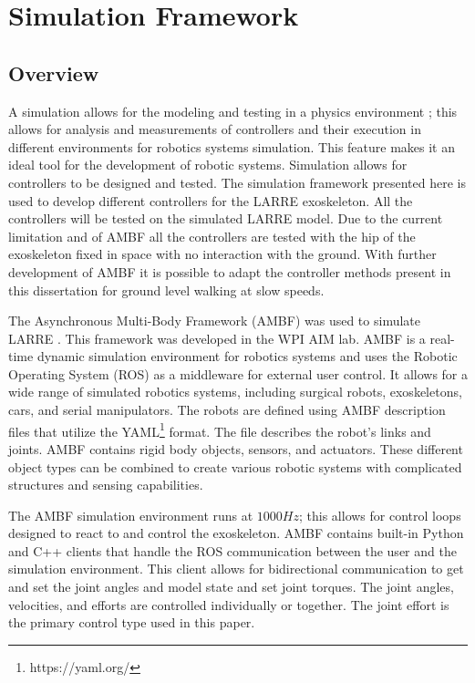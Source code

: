 \chapter{Simulation Framework}
\label{chap:sim}
\section{Overview}

A simulation allows for the modeling and testing in a physics environment \cite{vzlajpah2008simulation}; this allows for analysis and measurements of controllers and their execution in different environments for robotics systems simulation. This feature makes it an ideal tool for the development of robotic systems. Simulation allows for controllers to be designed and tested. The simulation framework presented here is used to develop different controllers for the LARRE exoskeleton. All the controllers will be tested on the simulated LARRE model. Due to the current limitation and of AMBF all the controllers are tested with the hip of the exoskeleton fixed in space with no interaction with the ground. With further development of AMBF it is possible to adapt the controller methods present in this dissertation for ground level walking at slow speeds. 

The Asynchronous Multi-Body Framework (AMBF) was used to simulate LARRE \cite{AMBF}. This framework was developed in the WPI AIM lab. 
AMBF is a real-time dynamic simulation environment for robotics systems and uses the Robotic Operating System (ROS)\cite{quigley2009ros} as a middleware for external user control. It allows for a wide range of simulated robotics systems, including surgical robots, exoskeletons, cars, and serial manipulators. The robots are defined using AMBF description files that utilize the YAML\footnote{https://yaml.org/} format. The file describes the robot's links and joints. AMBF contains rigid body objects, sensors, and actuators. These different object types can be combined to create various robotic systems with complicated structures and sensing capabilities. 
 
 
 The AMBF simulation environment runs at $1000Hz$; this allows for control loops designed to react to and control the exoskeleton.  AMBF contains built-in Python and C++ clients that handle the ROS communication between the user and the simulation environment. This client allows for bidirectional communication to get and set the joint angles and model state and set joint torques. The joint angles, velocities, and efforts are controlled individually or together. The joint effort is the primary control type used in this paper. 
 
